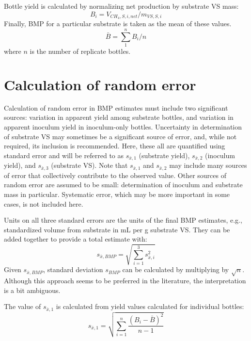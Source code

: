 \documentclass[]{article}
\begin{document}
Bottle yield is calculated by normalizing net  production by substrate VS mass:
\begin{equation}
  \label{eq:yield}
  B_{i} = V_{CH_4, S, i, net} / m_{VS, S, i}
\end{equation}
Finally, BMP for a particular substrate is taken as the mean of these values.
\begin{equation}
  \label{eq:BMP}
  \bar{B} = \sum_1 ^n B_{i} / n
\end{equation}
where $n$ is the number of replicate bottles.

\section{Calculation of random error}
Calculation of random error in BMP estimates must include two significant sources: variation in apparent yield among substrate bottles, and variation in apparent inoculum yield in inoculum-only bottles.
Uncertainty in determination of substrate VS may sometimes be a significant source of error, and, while not required, its inclusion is recommended. 
Here, these all are quantified using standard error and will be referred to as $s_{\bar{x},1}$ (substrate yield), $s_{\bar{x},2}$ (inoculum yield), and $s_{\bar{x},3}$ (substrate VS). 
Note that $s_{\bar{x},1}$ and $s_{\bar{x},2}$ may include many sources of error that collectively contribute to the observed value. 
Other sources of random error are assumed to be small: determination of inoculum and substrate mass in particular. 
Systematic error, which may be more important in some cases, is not included here. 

Units on all three standard errors are the units of the final BMP estimates, e.g., standardized  volume from substrate in mL per g substrate VS. 
They can be added together to provide a total estimate with:
\begin{equation}
  \label{eq:se_sum}
  s_{\bar{x},BMP} = \sqrt{\sum_{i=1} ^3 s_{\bar{x},i}^2}
\end{equation}
Given $s_{\bar{x},BMP}$, standard deviation $s_{BMP}$ can be calculated by multiplying by $\sqrt{n}$.
Although this approach seems to be preferred in the literature, the interpretation is a bit ambiguous. 

The value of $s_{\bar{x},1}$ is calculated from yield values calculated for individual bottles: 
\begin{equation}
  \label{eq:se1_calc}
  s_{\bar{x},1} = \sqrt{\sum_{i=1} ^n \frac{(B_i - \bar{B})^2} {n -1} }
\end{equation}
\end{document}

